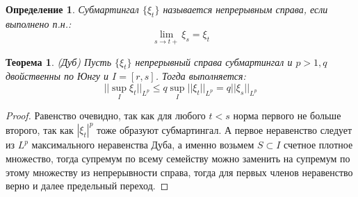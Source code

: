 \documentclass[12pt,a4paper]{article} %
\newtheorem{theorem}{Теорема}
\newtheorem{definition}{Определение}
\begin{document}
	\begin{definition}
		Субмартингал $\{\xi_t\}$ называется непрерывным справа, если выполнено п.н.:
		$$\lim\limits_{s\rightarrow t+}\xi_s=\xi_t$$
	\end{definition}
	\begin{theorem}
		(Дуб) Пусть $\{\xi_t\}$ непрерывный справа субмартингал и $p>1,q$ двойственны по Юнгу и $I=[r,s]$. Тогда выполняется:
		$$||\sup\limits_I\xi_t||_{L^p}\leq q\sup\limits_I||\xi_t||_{L^p}=q||\xi_s||_{L^p}$$
	\end{theorem}
	\begin{proof}
		Равенство очевидно, так как для любого $t<s$ норма первого не больше второго, так как $|\xi_t|^p$ тоже образуют субмартингал. А первое неравенство следует из $L^p$ максимального неравенства Дуба, а именно возьмем $S\subset I$ счетное плотное множество, тогда супремум по всему семейству можно заменить на супремум по этому множеству из непрерывности справа, тогда для первых членов неравенство верно и далее предельный переход.
	\end{proof}
\end{document}
